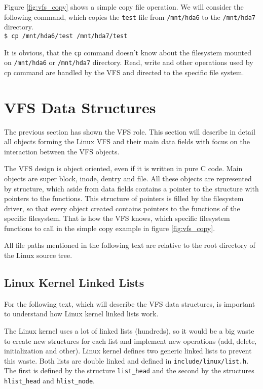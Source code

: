 Figure \ref{fig:vfs_copy} shows a simple copy file operation. We will consider the
following command, which copies the \texttt{test} file from \texttt{/mnt/hda6} to
the \texttt{/mnt/hda7} directory. \\

\texttt{\$ cp /mnt/hda6/test /mnt/hda7/test\\}

It is obvious, that the \texttt{cp} command doesn't know about the filesystem
mounted on \texttt{/mnt/hda6} or \texttt{/mnt/hda7} directory. Read, write and other
operations used by cp command are handled by the VFS and directed to the specific file
system.

\section{VFS Data Structures}
\label{lab:data_struct}
The previous section has shown the VFS role. This section will describe in detail all
objects forming the Linux VFS and their main data fields with focus on the interaction
between the VFS objects.

The VFS design is object oriented, even if it is written in pure C code. Main objects
are super block, inode, dentry and file. All these objects are represented by
structure, which aside from data fields contains a pointer to the structure with
pointers to the functions. This structure of pointers is filled by the filesystem
driver, so that every object created contains pointers to the functions of the
specific filesystem. That is how the VFS knows, which specific filesystem functions
to call in the simple copy example in figure \ref{fig:vfs_copy}.

All file paths mentioned in the following text are relative to the root directory
of the Linux source tree. 

\subsection{Linux Kernel Linked Lists}
For the following text, which will describe the VFS data structures, is important to
understand how Linux kernel linked lists work.

The Linux kernel uses a lot of linked lists (hundreds), so it would be a big waste to
create new structures for each list and implement new operations (add, delete,
initialization and other). Linux kernel defines two generic linked lists to prevent
this waste. Both lists are double linked and defined in 
\texttt{include/linux/list.h}. The first is defined by the structure \texttt{list\_head}
and the second by the structures \texttt{hlist\_head} and \texttt{hlist\_node}.

